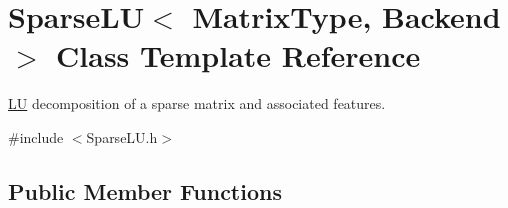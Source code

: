 \hypertarget{class_sparse_l_u}{\section{Sparse\-L\-U$<$ Matrix\-Type, Backend $>$ Class Template Reference}
\label{class_sparse_l_u}
}


\hyperlink{class_l_u}{L\-U} decomposition of a sparse matrix and associated features.  




{\ttfamily \#include $<$Sparse\-L\-U.\-h$>$}

\subsection*{Public Member Functions}
